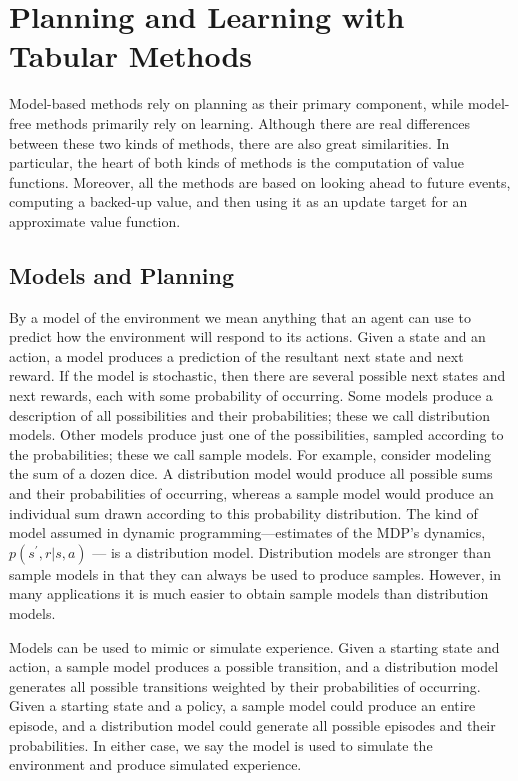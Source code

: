 \documentclass{article}
\begin{document}
\section{Planning and Learning with Tabular Methods}

Model-based methods rely on planning as their primary component, while model-free methods primarily rely on learning. Although there are real differences between 
these two kinds of methods, there are also great similarities. In particular, the heart of both kinds of methods is the computation of value functions. Moreover, all the methods 
are based on looking ahead to future events, computing a backed-up value, and then using it as an update target for an approximate value function.

\subsection{Models and Planning}

By a model of the environment we mean anything that an agent can use to predict how the environment will respond to its actions. Given a state and an action, 
a model produces a prediction of the resultant next state and next reward. If the model is stochastic, then there are several possible next states and next rewards, 
each with some probability of occurring. Some models produce a description of all possibilities and their probabilities; these we call distribution models. 
Other models produce just one of the possibilities, sampled according to the probabilities; these we call sample models. 
For example, consider modeling the sum of a dozen dice. A distribution model would produce all possible sums and their probabilities of occurring, 
whereas a sample model would produce an individual sum drawn according to this probability distribution. The kind of model assumed in dynamic programming—estimates of the 
MDP's dynamics, $p ( s ^ { \prime } , r   |   s , a )$ — is a distribution model. Distribution models are stronger than sample models in that they can always be used to produce samples. 
However, in many applications it is much easier to obtain sample models than distribution models.

Models can be used to mimic or simulate experience. Given a starting state and action, a sample model produces a possible transition, and a distribution model generates 
all possible transitions weighted by their probabilities of occurring. Given a starting state and a policy, a sample model could produce an entire episode, 
and a distribution model could generate all possible episodes and their probabilities. In either case, we say the model is used to simulate the environment and produce simulated experience.
\end{document}
